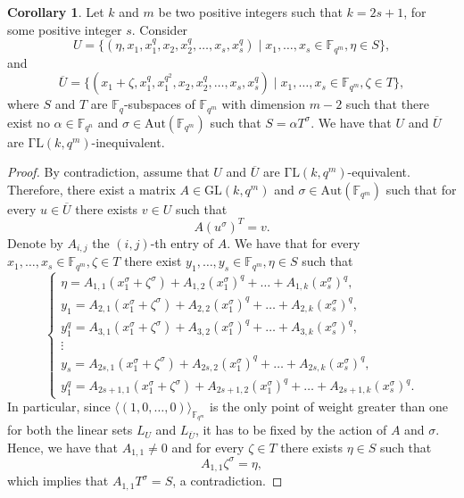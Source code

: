 \documentclass[11pt]{amsart}
\theoremstyle{definition}
\newtheorem{corollary}[theorem]{Corollary}
\newcommand{\fqn}{\mathbb{F}_{q^n}}
\newcommand{\fq}{{\mathbb F}_{q}}
\newcommand{\la}{\langle}
\newcommand{\ra}{\rangle}
\newcommand{\fqm}{\mathbb{F}_{q^m}}
\begin{document}
\begin{corollary}
    Let $k$ and $m$ be two positive integers such that $k=2s+1$, for some positive integer $s$.
    Consider
    $$U=\{(\eta,x_1,x_1^{q}, x_2, x_2^{q}, \ldots, x_s,x_s^{q} )\mid x_1,\ldots,x_s\in \mathbb{F}_{q^m}, \eta\in S\},$$
    and
    $$\overline{U}=\{(x_1+\zeta,x_1^q,x_1^{q^2}, x_2, x_2^{q}, \ldots, x_s,x_s^{q} )\mid x_1,\ldots,x_s\in \mathbb{F}_{q^m}, \zeta\in T\},$$
    where $S$ and $T$ are $\fq$-subspaces of $\fqm$ with dimension $m-2$ such that there exist no $\alpha \in \fqn$ and $\sigma \in \mathrm{Aut}(\fqm)$ such that $S=\alpha T^\sigma$.
    We have that $U$ and $\overline{U}$ are $\mathrm{\Gamma L}(k,q^m)$-inequivalent.
\end{corollary}
\begin{proof}
    By contradiction, assume that $U$ and $\overline{U}$ are $\mathrm{\Gamma L}(k,q^m)$-equivalent. Therefore, there exist a matrix $A \in \mathrm{GL}(k,q^m)$ and $\sigma \in \mathrm{Aut}(\fqm)$ such that for every $u \in \overline{U}$ there exists $v \in U$ such that
    \[ A (u^\sigma)^T=v. \]
    Denote by $A_{i,j}$ the $(i,j)$-th entry of $A$. 
    We have that for every $x_1,\ldots,x_s\in \mathbb{F}_{q^m}, \zeta\in T$ there exist $y_1,\ldots,y_s\in \mathbb{F}_{q^m}, \eta\in S$ such that
    \[
    \left\{
    \begin{array}{llll}
    \eta =A_{1,1}(x_1^\sigma+\zeta^\sigma)+A_{1,2}(x_1^\sigma)^q+\ldots+A_{1,k}(x_s^\sigma)^q,\\
    y_1=A_{2,1}(x_1^\sigma+\zeta^\sigma)+A_{2,2}(x_1^\sigma)^q+\ldots+A_{2,k}(x_s^\sigma)^q,\\
    y_1^q=A_{3,1}(x_1^\sigma+\zeta^\sigma)+A_{3,2}(x_1^\sigma)^q+\ldots+A_{3,k}(x_s^\sigma)^q,\\
    \vdots\\
    y_s=A_{2s,1}(x_1^\sigma+\zeta^\sigma)+A_{2s,2}(x_1^\sigma)^q+\ldots+A_{2s,k}(x_s^\sigma)^q,\\
    y_1^q=A_{2s+1,1}(x_1^\sigma+\zeta^\sigma)+A_{2s+1,2}(x_1^\sigma)^q+\ldots+A_{2s+1,k}(x_s^\sigma)^q.
    \end{array}
    \right.
    \]
    In particular, since $\la (1,0,\ldots,0)\ra_{\fqm}$ is the only point of weight greater than one for both the linear sets $L_U$ and $L_{\overline{U}}$, it has to be fixed by the action of $A$ and $\sigma$. Hence, we have that $A_{1,1}\neq 0$ and for every $\zeta\in T$ there exists $\eta\in S$ such that 
    \[ A_{1,1} \zeta^\sigma=\eta,\]
    which implies that $A_{1,1}T^\sigma=S$, a contradiction.

\end{proof}
\end{document}
